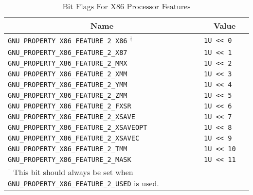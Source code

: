 \begin{table}[H]
\Hrule
  \caption{Bit Flags For X86 Processor Features}
  \begin{center}
    \begin{tabular}[t]{l|l}
      \multicolumn{1}{c}{Name} & \multicolumn{1}{c}{Value} \\
      \hline
     \texttt{GNU_PROPERTY_X86_FEATURE_2_X86} $^\dagger$ & \texttt{1U << 0} \\
     \texttt{GNU_PROPERTY_X86_FEATURE_2_X87} & \texttt{1U << 1} \\
     \texttt{GNU_PROPERTY_X86_FEATURE_2_MMX} & \texttt{1U << 2} \\
     \texttt{GNU_PROPERTY_X86_FEATURE_2_XMM} & \texttt{1U << 3} \\
     \texttt{GNU_PROPERTY_X86_FEATURE_2_YMM} & \texttt{1U << 4} \\
     \texttt{GNU_PROPERTY_X86_FEATURE_2_ZMM} & \texttt{1U << 5} \\
     \texttt{GNU_PROPERTY_X86_FEATURE_2_FXSR} & \texttt{1U << 6} \\
     \texttt{GNU_PROPERTY_X86_FEATURE_2_XSAVE} & \texttt{1U << 7} \\
     \texttt{GNU_PROPERTY_X86_FEATURE_2_XSAVEOPT} & \texttt{1U << 8} \\
     \texttt{GNU_PROPERTY_X86_FEATURE_2_XSAVEC} & \texttt{1U << 9} \\
     \texttt{GNU_PROPERTY_X86_FEATURE_2_TMM} & \texttt{1U << 10} \\
     \texttt{GNU_PROPERTY_X86_FEATURE_2_MASK} & \texttt{1U << 11} \\
    \cline{1-2}
    \multicolumn{2}{p{13cm}}{\small $^\dagger$ This bit should always
    be set when \texttt{GNU_PROPERTY_X86_FEATURE_2_USED} is used.}\\
    \end{tabular}
  \end{center}
\end{table}

